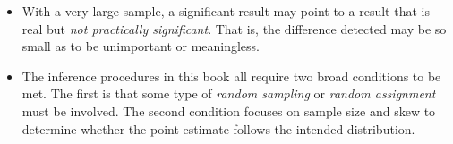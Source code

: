 \begin{itemize}
\item With a very large sample, a significant result may point to a result that is real but \emph{not practically significant}. That is, the difference detected may be so small as to be unimportant or meaningless.  

\item The inference procedures in this book all require two broad conditions to be met.  The first is that some type of \emph{random sampling} or \emph{random assignment} must be involved.  The second condition focuses on sample size and skew to determine whether the point estimate follows the intended distribution.  
\end{itemize}



{}





\newpage
\reviewchapterheader{}


